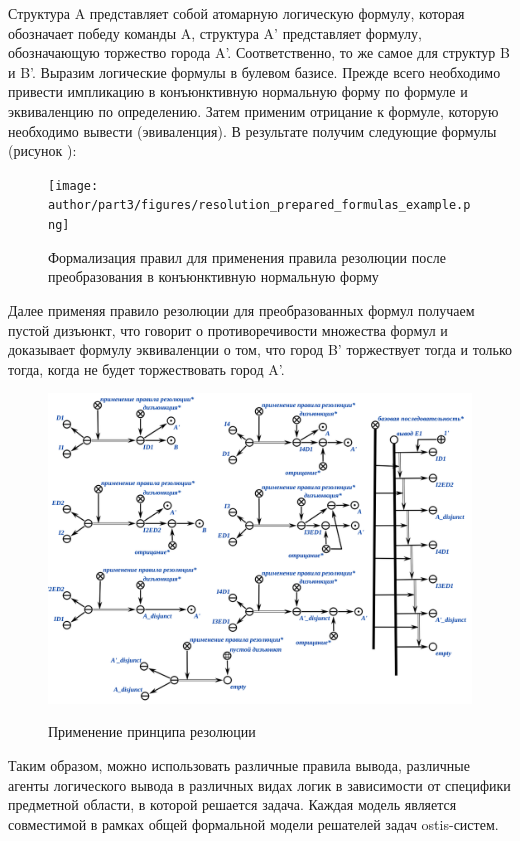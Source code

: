 Структура A представляет собой атомарную логическую формулу, которая обозначает победу команды A, структура A' представляет формулу, обозначающую торжество города A'. Соответственно, то же самое для структур B и B'.
Выразим логические формулы в булевом базисе. Прежде всего необходимо привести импликацию в конъюнктивную нормальную форму по формуле \textit{} и эквиваленцию по определению. Затем применим отрицание к формуле, которую необходимо вывести (эвиваленция). В результате получим следующие формулы (рисунок \textit{}):

\begin{figure}[H]
	\caption{Формализация правил для применения правила резолюции после преобразования в конъюнктивную нормальную форму}
	\texttt{[image: author/part3/figures/resolution\_prepared\_formulas\_example.png]}
	\label{fig:resolution_prepared_formulas}
\end{figure}

Далее применяя правило резолюции для преобразованных формул получаем пустой дизъюнкт, что говорит о противоречивости множества формул и доказывает формулу эквиваленции о том, что город B' торжествует тогда и только тогда, когда не будет торжествовать город A'.

\begin{figure}[H]
	\caption{Применение принципа резолюции}
	\includegraphics[scale=0.7]{author/part3/figures/resolution_inference.png}
	\label{fig:resolution_inference}
\end{figure}

Таким образом, можно использовать различные правила вывода, различные агенты логического вывода в различных видах логик в зависимости от специфики предметной области, в которой решается задача. Каждая модель является совместимой в рамках общей формальной модели решателей задач ostis-систем.

